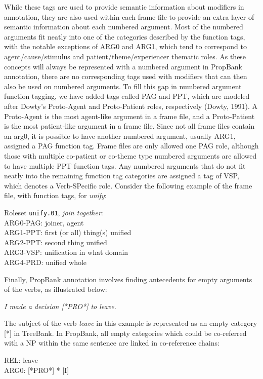 \documentclass[11pt]{report}
\begin{document}
\noindent While these tags are used to provide semantic information about modifiers in annotation, they are also used within each frame file to provide an extra layer of semantic information about each numbered argument. Most of the numbered arguments fit neatly into one of the categories described by the function tags, with the notable exceptions of ARG0 and ARG1, which tend to correspond to agent/cause/stimulus and patient/theme/experiencer thematic roles. As these concepts will always be represented with a numbered argument in PropBank annotation, there are no corresponding tags used with modifiers that can then also be used on numbered arguments. To fill this gap in numbered argument function tagging, we have added tags called PAG and PPT, which are modeled after Dowty’s Proto-Agent and Proto-Patient roles, respectively (Dowty, 1991). A Proto-Agent is the most agent-like argument in a frame file, and a Proto-Patient is the most patient-like argument in a frame file. Since not all frame files contain an arg0, it is possible to have another numbered argument, usually ARG1, assigned a PAG function tag. Frame files are only allowed one PAG role, although those with multiple co-patient or co-theme type numbered arguments are allowed to have multiple PPT function tags. Any numbered arguments that do not fit neatly into the remaining function tag categories are assigned a tag of VSP, which denotes a Verb-SPecific role. Consider the following example of the frame file, with function tags, for  \textit{unify}:

Roleset \texttt{unify.01}, \textit{join together}:\\
ARG0-PAG: joiner, agent\\
ARG1-PPT: first (or all) thing(s) unified\\
ARG2-PPT: second thing unified\\
ARG3-VSP: unification in what domain\\
ARG4-PRD: unified whole

\noindent Finally, PropBank annotation involves finding antecedents for empty arguments of the verbs, as illustrated below:

\textit{I made a decision [*PRO*] to leave.}

\noindent The subject of the verb \textit{leave} in this example is represented as an empty category [*] in TreeBank. In PropBank, all empty categories which could be co-referred with a NP within the same sentence are linked in co-reference chains:

REL: 	leave\\
ARG0: 	[*PRO*]  * [I]
\end{document}
